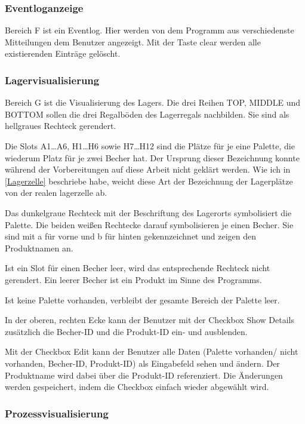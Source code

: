 \subsubsection{Eventloganzeige}
Bereich \glqq F\grqq{} ist ein Eventlog. Hier werden von dem Programm aus verschiedenste Mitteilungen dem Benutzer angezeigt.
Mit der Taste \glqq clear\grqq{} werden alle existierenden Einträge gelöscht.

\subsubsection{Lagervisualisierung}
Bereich \glqq G\grqq{} ist die Visualisierung des Lagers.
Die drei Reihen \glqq TOP\grqq{}, \glqq MIDDLE\grqq{} und \glqq BOTTOM\grqq{} sollen die drei Regalböden des Lagerregals nachbilden.
Sie sind als hellgraues Rechteck gerendert.

Die Slots A1\ldots A6, H1\ldots H6 sowie H7\ldots H12 sind die Plätze für je eine Palette, die wiederum Platz für
je zwei Becher hat.
Der Ursprung dieser Bezeichnung konnte während der Vorbereitungen auf diese Arbeit nicht geklärt werden.
Wie ich in \ref{Lagerzelle} beschriebe habe, weicht diese Art der Bezeichnung der Lagerplätze von der realen lagerzelle ab.

Das dunkelgraue Rechteck mit der Beschriftung des Lagerorts symbolisiert die Palette.
Die beiden weißen Rechtecke darauf symbolisieren je einen Becher.
Sie sind mit \glqq a\grqq{} für vorne und \glqq b\grqq{} für hinten gekennzeichnet und zeigen den Produktnamen an.

Ist ein Slot für einen Becher leer, wird das entsprechende Rechteck nicht gerendert.
Ein leerer Becher ist ein Produkt im Sinne des Programms.

Ist keine Palette vorhanden, verbleibt der gesamte Bereich der Palette leer.

In der oberen, rechten Ecke kann der Benutzer mit der Checkbox \glqq Show Details\grqq{} zusätzlich die Becher-ID und die
Produkt-ID ein- und ausblenden.

Mit der Checkbox \glqq Edit\grqq{} kann der Benutzer alle Daten (Palette vorhanden/ nicht vorhanden, Becher-ID, Produkt-ID)
als Eingabefeld sehen und ändern.
Der Produktname wird dabei über die Produkt-ID referenziert.
Die Änderungen werden gespeichert, indem die Checkbox einfach wieder abgewählt wird.

\subsubsection{Prozessvisualisierung}

